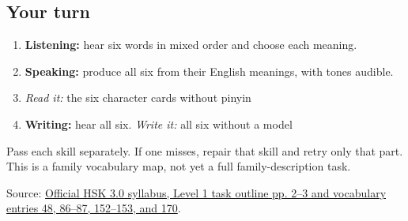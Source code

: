 \subsection*{Your turn}
\begin{enumerate}
\raggedright
  \item \textbf{Listening:} hear six words in mixed order and choose each meaning.
  \item \textbf{Speaking:} produce all six from their English meanings, with tones audible.
  \item \emph{Read it:} the six character cards without pinyin
  \item \textbf{Writing:} hear all six. \emph{Write it:} all six without a model
\end{enumerate}

Pass each skill separately. If one misses, repair that skill and retry only that part. This is a family vocabulary map, not yet a full family-description task.

\begin{tcolorbox}[breakable,colback=teal!4,colframe=teal!35!black,title={Before you move on}]
Source: \href{https://hsk.cn-bj.ufileos.com/3.0/\%E6\%96\%B0\%E7\%89\%88HSK\%E8\%80\%83\%E8\%AF\%95\%E5\%A4\%A7\%E7\%BA\%B21219.pdf}{Official HSK 3.0 syllabus, Level 1 task outline pp. 2–3 and vocabulary entries 48, 86–87, 152–153, and 170}.
\end{tcolorbox}
